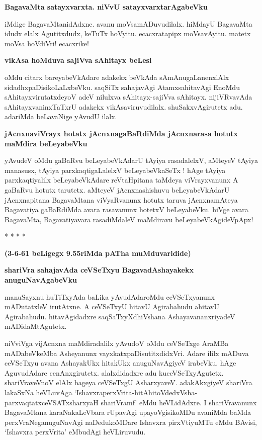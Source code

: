 {\bigskip
\noindent
{\large\bf BagavaMta satayxvarxta. niVvU satayxvarxtarAgabeVku}}\label{page79a}
\medskip

\noindent
iMdige BagavaMtanidAdxne. avanu moVsamADuvudilalx. hiMdayU BagavaMta idudx elalx Agutitxdudx, keTuTx hoVyitu. ecacxratapipx moVsavAyitu. matetx moVsa hoVdiVri! ecacxrike!

{\bigskip
\noindent
{\large\bf vikAsa hoMduva sajiVva sAhitayx beLesi}}\label{page79c}
\medskip

\noindent
oMdu citarx bareyabeVkAdare adakekx beVkAda sAmAnugaLanenxlAlx sidadhxpaDisikoLaLxbeVku. saqSiTx sahajavAgi AtamxsahitavAgi EnoMdu sAhitayxvirutatxdeyoV adeV nilulxva sAhitayx-sajiVva sAhitayx. nijiVRvavAda sAhitayxvaninxTaTxrU adakekx vikAsaviruvudilalx. shuSakxvAgirutetx adu. adariMda beLavaNige yAvudU ilalx.

{\bigskip
\noindent
{\large\bf jAcnxnaviVrayx hotatx jAcnxnagaBaRdiMda jAcnxnarasa hotutx maMdira beLeyabeVku}}\label{page79b}
\medskip

\noindent
yAvudeV oMdu gaBaRvu beLeyabeVkAdarU tAyiya rasadalelxV, aMteyeV tAyiya manasusx, tAyiya parxkaqtigaLalelxV beLeyabeVkaSeTx ! hAge tAyiya parxkaqtiyalilx beLeyabeVkAdare reVtaHpitana taMdeya viVrayxvanunx A gaBaRvu hotutx tarutetx. aMteyeV jAcnxnashishuvu beLeyabeVkAdarU jAcnxnapitana BagavaMtana viVyaRvanunx hotutx taruva jAcnxnamAteya Bagavatiya gaBaRdiMda avara rasavanunx hotetxV beLeyabeVku. hiVge avara BagavaMta, Bagavatiyavara rasadiMdaleV maMdiravu beLeyabeVkAgideVpApx!

\begin{center}
* * * *
\end{center}

{\bf (3-6-61 beLigegx 9.55riMda pATha muMduvaridide)}

{\bigskip
\noindent
{\large\bf shariVra sahajavAda ceVSeTxyu BagavadAshayakekx anuguNavAgabeVku}}\label{80}
\medskip

\noindent
manuSayxnu huTiTxyAda baLika yAvudAdaroMdu ceVSeTxyanunx mADutatxleV irutAtxne. A ceVSeTxyU hitavU Agirabahudu ahitavU Agirabahudu. hitavAgidadxre saqSaTxyXdhiVshana AshayavananxriyadeV mADidaMtAgutetx. 

niVviVga vijAcnxna maMdiradalilx yAvudoV oMdu ceVSeTxge AraMBa mADabeVkeMba Asheyanunx vayxkatxpaDisutitxdidxVri. Adare ililx mADuva ceVSeTxyu avana AshayakUkx hitakUkx anuguNavAgiyeV irabeVku. hAge AguvudAdare cenAnxgirutetx. alalxdidadxre adu kuceVSeTxyAgutetx. shariVraveVnoV elAlx bageya ceVSeTxgU AsharxyaveV. adakAkxgiyeV shariVra lakaSxNa heVLuvAga `IshavxraperxVrita-hitAhitoVdedxVsha-parxvaqtatxceVSATxsharxyaH shariVramf'\label{80a} eMdu heVLidAdxre. I shariVravanunx BagavaMtana karaNakaLeVbara rUpavAgi upayoVgisikoMDu avaniMda baMda perxVraNeganuguNavAgi naDedukoMDare Ishavxra pirxVtiyuMTu eMdu BAvisi, `Ishavxra perxVrita' eMbudAgi heVLiruvudu.

